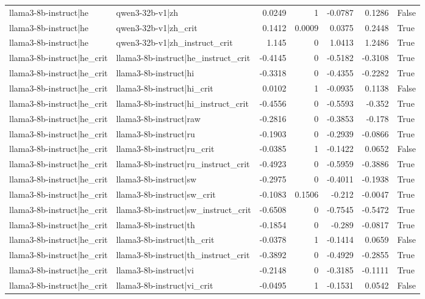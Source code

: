 \begin{table}
\begin{tabular}{l l r r r r l}
llama3-8b-instruct|he & qwen3-32b-v1|zh & 0.0249 & 1 & -0.0787 & 0.1286 & False \\
llama3-8b-instruct|he & qwen3-32b-v1|zh_crit & 0.1412 & 0.0009 & 0.0375 & 0.2448 & True \\
llama3-8b-instruct|he & qwen3-32b-v1|zh_instruct_crit & 1.145 & 0 & 1.0413 & 1.2486 & True \\
llama3-8b-instruct|he_crit & llama3-8b-instruct|he_instruct_crit & -0.4145 & 0 & -0.5182 & -0.3108 & True \\
llama3-8b-instruct|he_crit & llama3-8b-instruct|hi & -0.3318 & 0 & -0.4355 & -0.2282 & True \\
llama3-8b-instruct|he_crit & llama3-8b-instruct|hi_crit & 0.0102 & 1 & -0.0935 & 0.1138 & False \\
llama3-8b-instruct|he_crit & llama3-8b-instruct|hi_instruct_crit & -0.4556 & 0 & -0.5593 & -0.352 & True \\
llama3-8b-instruct|he_crit & llama3-8b-instruct|raw & -0.2816 & 0 & -0.3853 & -0.178 & True \\
llama3-8b-instruct|he_crit & llama3-8b-instruct|ru & -0.1903 & 0 & -0.2939 & -0.0866 & True \\
llama3-8b-instruct|he_crit & llama3-8b-instruct|ru_crit & -0.0385 & 1 & -0.1422 & 0.0652 & False \\
llama3-8b-instruct|he_crit & llama3-8b-instruct|ru_instruct_crit & -0.4923 & 0 & -0.5959 & -0.3886 & True \\
llama3-8b-instruct|he_crit & llama3-8b-instruct|sw & -0.2975 & 0 & -0.4011 & -0.1938 & True \\
llama3-8b-instruct|he_crit & llama3-8b-instruct|sw_crit & -0.1083 & 0.1506 & -0.212 & -0.0047 & True \\
llama3-8b-instruct|he_crit & llama3-8b-instruct|sw_instruct_crit & -0.6508 & 0 & -0.7545 & -0.5472 & True \\
llama3-8b-instruct|he_crit & llama3-8b-instruct|th & -0.1854 & 0 & -0.289 & -0.0817 & True \\
llama3-8b-instruct|he_crit & llama3-8b-instruct|th_crit & -0.0378 & 1 & -0.1414 & 0.0659 & False \\
llama3-8b-instruct|he_crit & llama3-8b-instruct|th_instruct_crit & -0.3892 & 0 & -0.4929 & -0.2855 & True \\
llama3-8b-instruct|he_crit & llama3-8b-instruct|vi & -0.2148 & 0 & -0.3185 & -0.1111 & True \\
llama3-8b-instruct|he_crit & llama3-8b-instruct|vi_crit & -0.0495 & 1 & -0.1531 & 0.0542 & False \\

\end{tabular}
\end{table}
